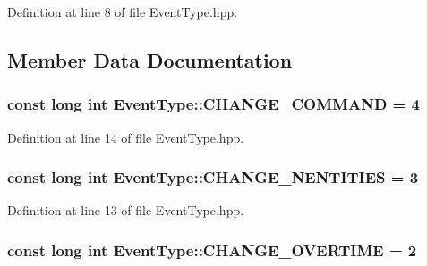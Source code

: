 Definition at line 8 of file Event\+Type.\+hpp.



\subsection{Member Data Documentation}
\hypertarget{class_event_type_a629e3d685d63919782264bfdce5a0840}{
\subsubsection[{C\+H\+A\+N\+G\+E\+\_\+\+C\+O\+M\+M\+A\+N\+D}]{\setlength{\rightskip}{0pt plus 5cm}const long int Event\+Type\+::\+C\+H\+A\+N\+G\+E\+\_\+\+C\+O\+M\+M\+A\+N\+D = 4\hspace{0.3cm}{\ttfamily [static]}}}\label{class_event_type_a629e3d685d63919782264bfdce5a0840}


Definition at line 14 of file Event\+Type.\+hpp.

\hypertarget{class_event_type_acce4c6fe0be1a38d2eea02392a514704}{
\subsubsection[{C\+H\+A\+N\+G\+E\+\_\+\+N\+E\+N\+T\+I\+T\+I\+E\+S}]{\setlength{\rightskip}{0pt plus 5cm}const long int Event\+Type\+::\+C\+H\+A\+N\+G\+E\+\_\+\+N\+E\+N\+T\+I\+T\+I\+E\+S = 3\hspace{0.3cm}{\ttfamily [static]}}}\label{class_event_type_acce4c6fe0be1a38d2eea02392a514704}


Definition at line 13 of file Event\+Type.\+hpp.

\hypertarget{class_event_type_a7c6c84e45483e730bc2259589a517dec}{
\subsubsection[{C\+H\+A\+N\+G\+E\+\_\+\+O\+V\+E\+R\+T\+I\+M\+E}]{\setlength{\rightskip}{0pt plus 5cm}const long int Event\+Type\+::\+C\+H\+A\+N\+G\+E\+\_\+\+O\+V\+E\+R\+T\+I\+M\+E = 2\hspace{0.3cm}{\ttfamily [static]}}}\label{class_event_type_a7c6c84e45483e730bc2259589a517dec}


